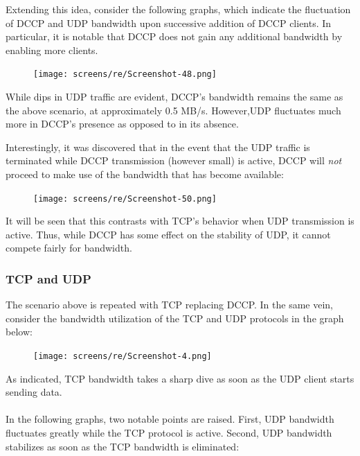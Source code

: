 \documentclass[10pt,a4paper]{article}
\begin{document}
Extending this idea, consider the following graphs, which indicate the
fluctuation
of DCCP and UDP bandwidth upon successive addition of DCCP clients. In
particular, it is notable
that DCCP does not gain any additional bandwidth by enabling more clients.
\begin{figure}[!h]
\begin{center}
\hspace*{-65pt}
\texttt{[image: screens/re/Screenshot-48.png]}
\end{center}
\end{figure}

While dips in UDP traffic are evident, DCCP's bandwidth remains
the same as the above scenario, at approximately 0.5 MB/s. However,UDP
fluctuates much more in DCCP's presence as opposed to in its absence.

Interestingly, it was discovered that in the event that the UDP
traffic is terminated while DCCP transmission (however small) is active,
DCCP will \emph{not} proceed to make use of the bandwidth that has
become available:


\begin{figure}[!h]
\begin{center}
\hspace*{-65pt}
\texttt{[image: screens/re/Screenshot-50.png]}
\end{center}
\end{figure}

It will be seen that this contrasts with TCP's behavior when
UDP transmission is active. Thus, while DCCP has some effect
on the stability of UDP, it cannot compete fairly for bandwidth.

\subsubsection{TCP and UDP}
The scenario above is repeated with TCP replacing DCCP.
In the same vein, consider the bandwidth utilization of the TCP
and UDP protocols in the graph below:

\begin{figure}[!h]
\begin{center}
\hspace*{-65pt}
\texttt{[image: screens/re/Screenshot-4.png]}
\end{center}
\end{figure}

As indicated, TCP bandwidth takes a sharp dive as soon as
the UDP client starts sending data. 
\paragraph{}
In the following graphs, two notable points are raised. First,
UDP bandwidth fluctuates greatly while the TCP protocol is active.
Second, UDP bandwidth stabilizes as soon as the TCP bandwidth
is eliminated:
\end{document}
